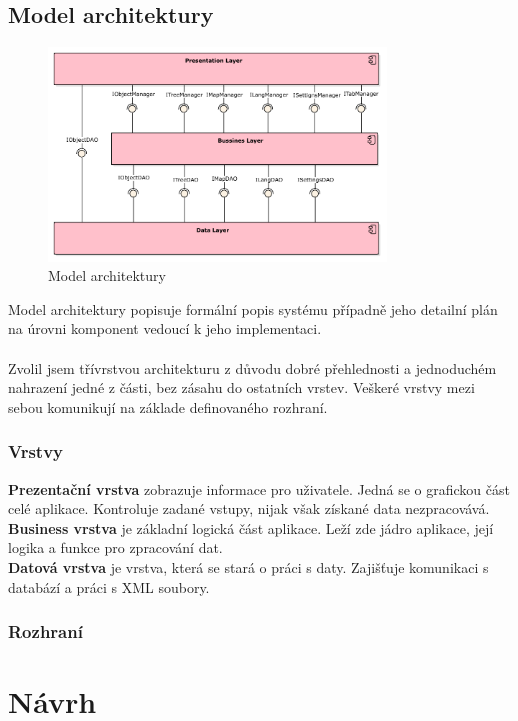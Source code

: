\documentclass[thesis=B,czech]{resources/FITthesis}[2012/06/26]
\begin{document}
\section{Model architektury}
\begin{figure}\centering
	\includegraphics[width=0.8\textwidth]{images/architektura}
	\caption[Model architektury]{Model architektury}\label{fig:architektura}
\end{figure}
Model architektury popisuje formální popis systému případně jeho detailní plán na úrovni komponent vedoucí k jeho implementaci.\\
\\
Zvolil jsem třívrstvou architekturu z důvodu dobré přehlednosti a jednoduchém nahrazení jedné z části, bez zásahu do ostatních vrstev. Veškeré vrstvy mezi sebou komunikují na základe definovaného rozhraní.\\
\subsection{Vrstvy}
\textbf{Prezentační vrstva} zobrazuje informace pro uživatele. Jedná se o grafickou část celé aplikace. Kontroluje zadané vstupy, nijak však získané data nezpracovává.\\
\textbf{Business vrstva} je základní logická část aplikace. Leží zde jádro aplikace, její logika a funkce pro zpracování dat.\\
\textbf{Datová vrstva} je vrstva, která se stará o práci s daty. Zajišťuje komunikaci s databází a práci s XML soubory.\\
\subsection{Rozhraní}

\chapter{Návrh}
\end{document}
